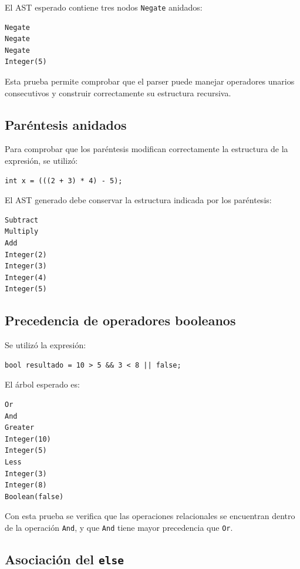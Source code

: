 \documentclass[12pt,letterpaper]{article}
\begin{document}
El AST esperado contiene tres nodos \texttt{Negate} anidados:

\begin{verbatim}
Negate
Negate
Negate
Integer(5)
\end{verbatim}

Esta prueba permite comprobar que el parser puede manejar operadores unarios consecutivos y construir correctamente su estructura recursiva.

\subsection*{Paréntesis anidados}

Para comprobar que los paréntesis modifican correctamente la estructura de la expresión, se utilizó:

\begin{verbatim}
int x = (((2 + 3) * 4) - 5);
\end{verbatim}

El AST generado debe conservar la estructura indicada por los paréntesis:

\begin{verbatim}
Subtract
Multiply
Add
Integer(2)
Integer(3)
Integer(4)
Integer(5)
\end{verbatim}

\subsection*{Precedencia de operadores booleanos}

Se utilizó la expresión:

\begin{verbatim}
bool resultado = 10 > 5 && 3 < 8 || false;
\end{verbatim}

El árbol esperado es:

\begin{verbatim}
Or
And
Greater
Integer(10)
Integer(5)
Less
Integer(3)
Integer(8)
Boolean(false)
\end{verbatim}

Con esta prueba se verifica que las operaciones relacionales se encuentran dentro de la operación \texttt{And}, y que \texttt{And} tiene mayor precedencia que \texttt{Or}.

\subsection*{Asociación del \texttt{else}}
\end{document}
